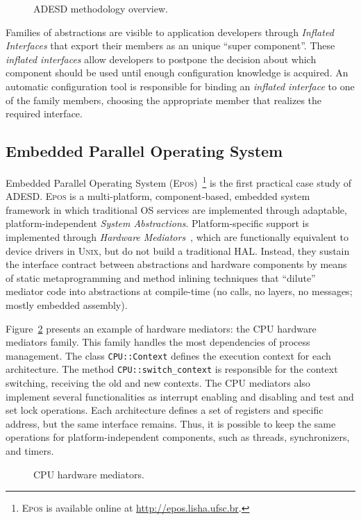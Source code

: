\documentclass[conference]{IEEEtran}
\newcommand{\fig}[4][ht!]{
	\begin{figure}[#1]
	{\centering{\texttt{[image: fig/\#2]}}\par}
	\caption{#3}
	\label{fig:#2}
	\end{figure}
}
\begin{document}
\fig{adesd}{ADESD methodology overview.}{scale=.68}

Families of abstractions are visible to application developers through \textit{Inflated Interfaces} that export their members as an unique ``super component''. These \textit{inflated interfaces} allow developers to postpone the decision about which component should be used until enough configuration knowledge is acquired. An automatic configuration tool is responsible for binding an \textit{inflated interface} to one of the family members, choosing the appropriate member that realizes the required interface.

\subsection{Embedded Parallel Operating System}

Embedded Parallel Operating System (\textsc{Epos})~\footnote{\textsc{Epos} is available online at \url{http://epos.lisha.ufsc.br}.} is the first practical case study of ADESD. \textsc{Epos} is a multi-platform, component-based, embedded system
framework in which traditional OS services are implemented through adaptable, platform-independent \emph{System Abstractions}. Platform-specific support is implemented through \emph{Hardware Mediators}~\cite{Polpeta2004}, which are functionally equivalent to device drivers in \textsc{Unix}, but do not build a traditional HAL. Instead, they sustain the interface contract between abstractions and hardware components by means of static metaprogramming and method inlining techniques that ``dilute'' mediator code into abstractions at compile-time (no calls, no layers, no messages; mostly embedded assembly).
 
Figure~\ref{fig:cpu_hardware_mediator} presents an example of hardware mediators: the CPU hardware mediators family. This family handles the most dependencies of process management. The class \texttt{CPU::Context} defines the execution context for each architecture. The method \texttt{CPU::switch\_context} is responsible for the context switching, receiving the old and new contexts. The CPU mediators also implement several functionalities as interrupt enabling and disabling and test and set lock operations. Each architecture defines a set of registers and specific address, but the same interface remains. Thus, it is possible to keep the same operations for platform-independent components, such as threads, synchronizers, and timers.

\fig{cpu_hardware_mediator}{CPU hardware mediators.}{scale=.31}
\end{document}
